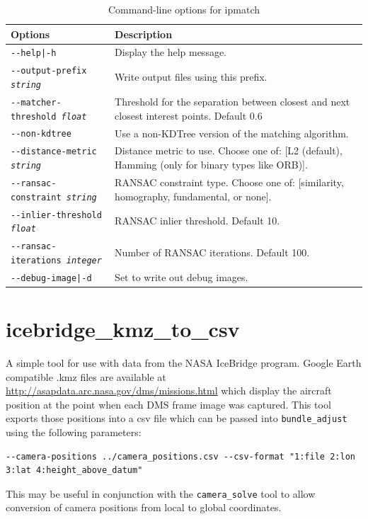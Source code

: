 \begin{longtable}{|l|p{9.5cm}|}
\caption{Command-line options for ipmatch}
\label{tbl:ipmatch}
\endfirsthead
\endhead
\endfoot
\endlastfoot
\hline
Options & Description \\ \hline \hline
\texttt{-\/-help|-h} & Display the help message. \\ \hline
\texttt{-\/-output-prefix \textit{string}} & Write output files using this prefix. \\ \hline
\texttt{-\/-matcher-threshold \textit{float}} & Threshold for the separation between closest and next closest interest points. Default 0.6\\ \hline
\texttt{-\/-non-kdtree} & Use a non-KDTree version of the matching algorithm.\\ \hline
\texttt{-\/-distance-metric \textit{string}} & Distance metric to use.  Choose one of: [L2 (default), Hamming (only for binary types like ORB)]. \\ \hline
\texttt{-\/-ransac-constraint \textit{string}} & RANSAC constraint type.  Choose one of: [similarity, homography, fundamental, or none]. \\ \hline
\texttt{-\/-inlier-threshold \textit{float}} & RANSAC inlier threshold. Default 10.\\ \hline
\texttt{-\/-ransac-iterations \textit{integer}} & Number of RANSAC iterations.  Default 100.\\ \hline
\texttt{-\/-debug-image|-d} & Set to write out debug images. \\ \hline
\end{longtable}


\clearpage


\section{icebridge\_kmz\_to\_csv}
\label{icebridgekmztocsv}

A simple tool for use with data from the NASA IceBridge program.  Google Earth compatible
.kmz files are available at \url{http://asapdata.arc.nasa.gov/dms/missions.html} which display
the aircraft position at the point when each DMS frame image was captured.  This tool exports
those positions into a csv file which can be passed into \texttt{bundle\_adjust} using
the following parameters:
\begin{verbatim}
--camera-positions ../camera_positions.csv --csv-format "1:file 2:lon 3:lat 4:height_above_datum"
\end{verbatim}
This may be useful in conjunction with the \texttt{camera\_solve} tool to allow conversion of camera
positions from local to global coordinates.

